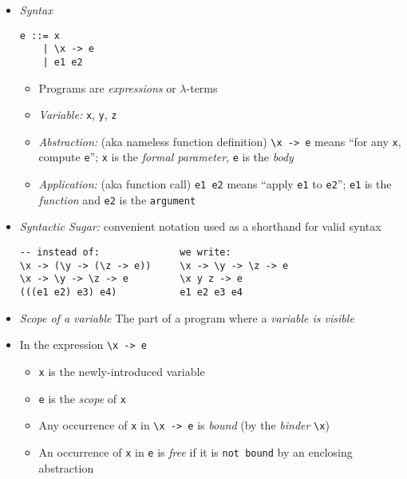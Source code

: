 \documentclass[landscape,8pt]{extarticle}
\newcommand{\code}{\lstinline}
\begin{document}
\footnotesize
\begin{multicols}{4}
    \setlength{\premulticols}{1pt}
    \setlength{\postmulticols}{1pt}
    \setlength{\multicolsep}{1pt}
    \setlength{\columnsep}{2pt}
    \begin{itemize}
        \item \emph{Syntax}
        \begin{lstlisting}
e ::= x
    | \x -> e
    | e1 e2
        \end{lstlisting}
        \begin{itemize}
            \item Programs are \emph{expressions} or $\lambda$-terms
            \item \emph{Variable:} \code{x}, \code{y}, \code{z}
            \item \emph{Abstraction:} (aka nameless function definition) \code{\x -> e} means ``for any \code{x}, compute \code{e}''; \code{x} is the \emph{formal parameter}, \code{e} is the \emph{body}
            \item \emph{Application:} (aka function call) \code{e1 e2} means ``apply \code{e1} to \code{e2}''; \code{e1} is the \emph{function} and \code{e2} is the \code{argument}
        \end{itemize}
        \item \emph{Syntactic Sugar:} convenient notation used as a shorthand for valid syntax
        \begin{lstlisting}
-- instead of:              we write:
\x -> (\y -> (\z -> e))     \x -> \y -> \z -> e
\x -> \y -> \z -> e         \x y z -> e
(((e1 e2) e3) e4)           e1 e2 e3 e4
        \end{lstlisting}
        \item \emph{Scope of a variable} The part of a program where a \emph{variable is visible}
        \item In the expression \code{\x -> e}
        \begin{itemize}
            \item \code{x} is the newly-introduced variable
            \item \code{e} is the \emph{scope} of \code{x}
            \item Any occurrence of \code{x} in \code{\x -> e} is \emph{bound} (by the \emph{binder} \code{\x})
            \item An occurrence of \code{x} in \code{e} is \emph{free} if it is \code{not bound} by an enclosing abstraction
        \end{itemize}

\end{itemize}
\end{multicols}
\end{document}
